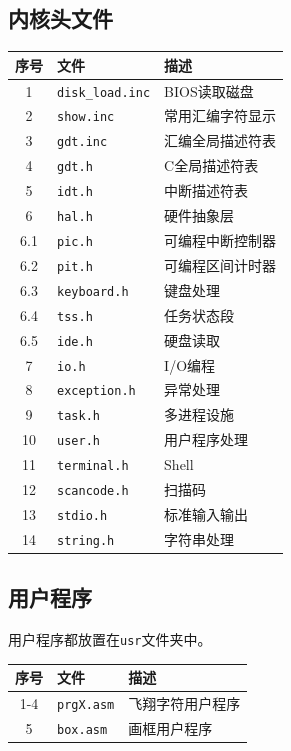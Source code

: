 \documentclass[logo,reportComp]{thesis}
\begin{document}
\subsection{内核头文件}
\begin{center}
\begin{tabular}{|c|l|l|}\hline
\textbf{序号} & \textbf{文件} & \textbf{描述} \\\hline
1 & \verb'disk_load.inc' & BIOS读取磁盘\\\hline
2 & \verb'show.inc' & 常用汇编字符显示\\\hline
3 & \verb'gdt.inc' & 汇编全局描述符表\\\hline
4 & \verb'gdt.h' & C全局描述符表\\\hline
5 & \verb'idt.h' & 中断描述符表\\\hline
6 & \verb'hal.h' & 硬件抽象层\\\hline
6.1 & \verb'pic.h' & 可编程中断控制器\\\hline
6.2 & \verb'pit.h' & 可编程区间计时器\\\hline
6.3 & \verb'keyboard.h' & 键盘处理\\\hline
6.4 & \verb'tss.h' & 任务状态段\\\hline
6.5 & \verb'ide.h' & 硬盘读取\\\hline
7 & \verb'io.h' & I/O编程\\\hline
8 & \verb'exception.h' & 异常处理\\\hline
9 & \verb'task.h' & 多进程设施\\\hline
10 & \verb'user.h' & 用户程序处理\\\hline
11 & \verb'terminal.h' & Shell\\\hline
12 & \verb'scancode.h' & 扫描码\\\hline
13 & \verb'stdio.h' & 标准输入输出\\\hline
14 & \verb'string.h' & 字符串处理\\\hline
\end{tabular}
\end{center}

\subsection{用户程序}
用户程序都放置在\verb'usr'文件夹中。
\begin{center}
\begin{tabular}{|c|l|l|}\hline
\textbf{序号} & \textbf{文件} & \textbf{描述} \\\hline
1-4 & \verb'prgX.asm' & 飞翔字符用户程序\\\hline
5 & \verb'box.asm' & 画框用户程序\\\hline
\end{tabular}
\end{center}
\end{document}
